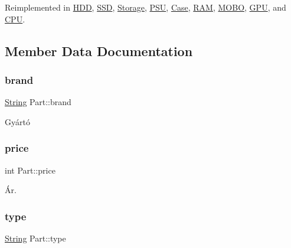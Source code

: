 Reimplemented in \mbox{\hyperlink{class_h_d_d_aca2c2583fa3304917905cd9185b64539}{H\+DD}}, \mbox{\hyperlink{class_s_s_d_ab07086e302f8be99cfa757583d2017a0}{S\+SD}}, \mbox{\hyperlink{class_storage_ab7ecf9e0777891b4e1a84bbf391a1cd4}{Storage}}, \mbox{\hyperlink{class_p_s_u_a81c74aa3a327003c58b89ca2b8602c1d}{P\+SU}}, \mbox{\hyperlink{class_case_ae179519844b825815f4accddafae13b6}{Case}}, \mbox{\hyperlink{class_r_a_m_a11a874dd6cf99454efd6b7a1d20a3737}{R\+AM}}, \mbox{\hyperlink{class_m_o_b_o_a4c78cec3a2a3e4d4480855622f50bd06}{M\+O\+BO}}, \mbox{\hyperlink{class_g_p_u_acfa9ab35cdf1c25c324fc39c6ffc2412}{G\+PU}}, and \mbox{\hyperlink{class_c_p_u_a0aea700bac0896b9e4434770737078d0}{C\+PU}}.



\subsection{Member Data Documentation}
\mbox{\label{class_part_ae06f2fdeb7fbbdb229a7aca151f3e341}} 
\subsubsection{\texorpdfstring{brand}{brand}}
{\footnotesize\ttfamily \mbox{\hyperlink{class_string}{String}} Part\+::brand\hspace{0.3cm}{\ttfamily [protected]}}



Gyártó 

\mbox{\label{class_part_a8e71223aed1da95a974f33d8d6c91bb1}} 
\subsubsection{\texorpdfstring{price}{price}}
{\footnotesize\ttfamily int Part\+::price\hspace{0.3cm}{\ttfamily [protected]}}



Ár. 

\mbox{\label{class_part_a101dbcc5c4b21564df7414c7eb0eae88}} 
\subsubsection{\texorpdfstring{type}{type}}
{\footnotesize\ttfamily \mbox{\hyperlink{class_string}{String}} Part\+::type\hspace{0.3cm}{\ttfamily [protected]}}



